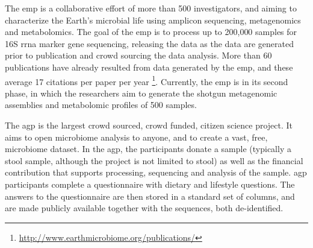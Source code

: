\documentclass[12pt,chapterheads]{ucsd}
\begin{document}
The \gls{emp} is a collaborative effort of more than 500 investigators, and aiming
to characterize the Earth's microbial life using amplicon sequencing,
metagenomics and metabolomics. The goal of the \gls{emp} is to process up to 200,000
samples for 16S \gls{rrna} marker gene sequencing, releasing the data as the data are
generated prior to publication and
crowd sourcing the data analysis. More than 60 publications have already resulted
from data generated by the \gls{emp}, and these average 17 citations per paper per year
\footnote{\label{emppuburl}\url{http://www.earthmicrobiome.org/publications/}}.
Currently, the \gls{emp} is in its second phase, in which the researchers aim to
generate the shotgun metagenomic assemblies and metabolomic profiles of 500 samples.

The \gls{agp} is the largest crowd sourced, crowd funded, citizen science project. It aims to
open microbiome analysis to anyone, and to create a vast, free, microbiome dataset.
In the \gls{agp}, the participants donate a sample (typically a stool sample,
although the project is not limited to stool) as well as the financial contribution
that supports processing, sequencing and analysis of the sample. \gls{agp} participants complete a
questionnaire with dietary and lifestyle questions. The answers to the
questionnaire are then stored in a standard set of columns, and are
made publicly available together with the sequences, both de-identified.
\end{document}
